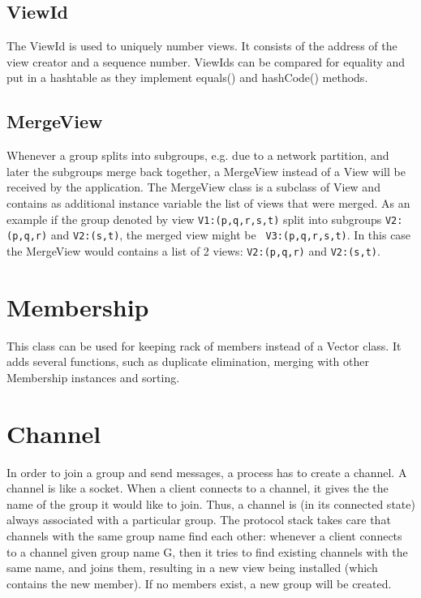     \subsection{ViewId} \label{ViewId}

    The ViewId is used to uniquely number views. It consists of the address of the
    view creator and a sequence number. ViewIds can be compared for equality and put
    in a hashtable as they implement equals() and hashCode() methods.


    \subsection{MergeView} \label{MergeView}

    Whenever a group splits into subgroups, e.g. due to a network partition, and
    later the subgroups merge back together, a MergeView instead of a View will be
    received by the application. The MergeView class is a subclass of View and
    contains as additional instance variable the list of views that were merged. As
    an example if the group denoted by view {\tt V1:(p,q,r,s,t)} split into subgroups
    {\tt V2:(p,q,r)} and {\tt V2:(s,t)}, the merged view might be {\tt
    V3:(p,q,r,s,t)}. In this case the MergeView would contains a list of 2 views:
    {\tt V2:(p,q,r)} and {\tt V2:(s,t)}.





  \section{Membership} \label{Membership}

  This class can be used for keeping rack of members instead of a Vector class. It
  adds several functions, such as duplicate elimination, merging with other
  Membership instances and sorting.


  
  \section{Channel} \label{Channels}

  In order to join a group and send messages, a process has to create a channel. A
  channel is like a socket. When a client connects to a channel, it gives the the
  name of the group it would like to join. Thus, a channel is (in its connected
  state) always associated with a particular group. The protocol stack takes care
  that channels with the same group name find each other: whenever a client connects
  to a channel given group name G, then it tries to find existing channels with the
  same name, and joins them, resulting in a new view being installed (which contains
  the new member). If no members exist, a new group will be created.


